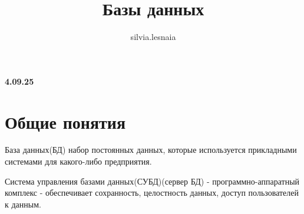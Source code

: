 \documentclass{article}
\title{Базы данных}
\author{silvia.lesnaia }
\begin{document}
\maketitle

\textbf{4.09.25}

\section{Общие понятия}

База данных(БД) набор постоянных данных, которые используется прикладными 
системами для какого-либо предприятия.

Система управления базами данных(СУБД)(сервер БД) - программно-аппаратный
комплекс - обеспечивает сохранность, целостность данных, доступ пользователей к данным.
\end{document}
